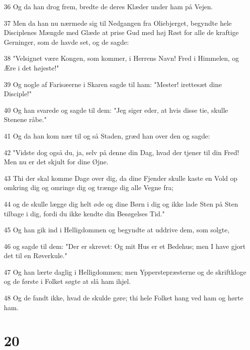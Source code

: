 \par 36 Og da han drog frem, bredte de deres Klæder under ham på Vejen.
\par 37 Men da han nu nærmede sig til Nedgangen fra Oliebjerget, begyndte hele Disciplenes Mængde med Glæde at prise Gud med høj Røst for alle de kraftige Gerninger, som de havde set, og de sagde:
\par 38 "Velsignet være Kongen, som kommer, i Herrens Navn! Fred i Himmelen, og Ære i det højeste!"
\par 39 Og nogle af Farisæerne i Skaren sagde til ham: "Mester! irettesæt dine Disciple!"
\par 40 Og han svarede og sagde til dem: "Jeg siger eder, at hvis disse tie, skulle Stenene råbe."
\par 41 Og da han kom nær til og så Staden, græd han over den og sagde:
\par 42 "Vidste dog også du, ja, selv på denne din Dag, hvad der tjener til din Fred! Men nu er det skjult for dine Øjne.
\par 43 Thi der skal komme Dage over dig, da dine Fjender skulle kaste en Vold op omkring dig og omringe dig og trænge dig alle Vegne fra;
\par 44 og de skulle lægge dig helt øde og dine Børn i dig og ikke lade Sten på Sten tilbage i dig, fordi du ikke kendte din Besøgelses Tid."
\par 45 Og han gik ind i Helligdommen og begyndte at uddrive dem, som solgte,
\par 46 og sagde til dem: "Der er skrevet: Og mit Hus er et Bedehus; men I have gjort det til en Røverkule."
\par 47 Og han lærte daglig i Helligdommen; men Ypperstepræsterne og de skriftkloge og de første i Folket søgte at slå ham ihjel.
\par 48 Og de fandt ikke, hvad de skulde gøre; thi hele Folket hang ved ham og hørte ham.

\chapter{20}

